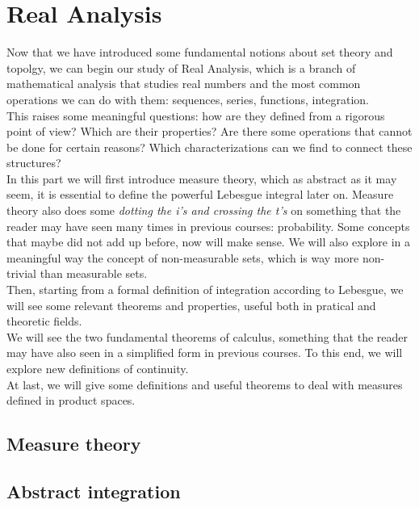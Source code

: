 \documentclass[11pt,twoside]{article}
\begin{document}
\newpage
\section{Real Analysis}
Now that we have introduced some fundamental notions about set theory and topolgy, we can begin our study of Real Analysis, which is a branch of mathematical analysis that studies real numbers and the most common operations we can do with them: sequences, series, functions, integration.\\
This raises some meaningful questions: how are they defined from a rigorous point of view? Which are their properties? Are there some operations that cannot be done for certain reasons? Which characterizations can we find to connect these structures?\\
In this part we will first introduce measure theory, which as abstract as it may seem, it is essential to define the powerful Lebesgue integral later on. Measure theory also does some \textit{dotting the i's and crossing the t's} on something that the reader may have seen many times in previous courses: probability. Some concepts that maybe did not add up before, now will make sense. We will also explore in a meaningful way the concept of non-measurable sets, which is way more non-trivial than measurable sets.\\
Then, starting from a formal definition of integration according to Lebesgue, we will see some relevant theorems and properties, useful both in pratical and theoretic fields.\\
We will see the two fundamental theorems of calculus, something that the reader may have also seen in a simplified form in previous courses. To this end, we will explore new definitions of continuity.\\
At last, we will give some definitions and useful theorems to deal with measures defined in product spaces.

\newpage
\subsection{Measure theory}




%

\newpage
\subsection{Abstract integration}



\end{document}
